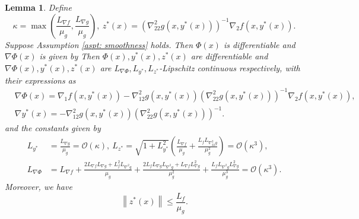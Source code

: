 \documentclass[10pt]{article}
\newtheorem{lemma}{Lemma}[section]
\theoremstyle{remark}
\newcommand{\cO}{\mathcal{O}}
\newcommand{\norm}[1]{\left\|#1\right\|}
\begin{document}
\begin{lemma}\label{lem: hypergrad}
    Define 
    \[
        \kappa = \max\left(\frac{L_{\nabla f} }{\mu_g}, \frac{L_{\nabla g}}{\mu_g}\right),\ z^*(x) = \left(\nabla_{22}^2g(x, y^*(x))\right)^{-1}\nabla_2f(x, y^*(x)).
    \]
    Suppose Assumption \ref{aspt: smoothness} holds. Then $\Phi(x)$ is differentiable and $\nabla\Phi(x)$ is given by
    Then $\Phi(x), y^*(x), z^*(x)$ are differentiable and $\nabla \Phi(x), y^*(x), z^*(x)$ are $L_{\nabla\Phi}, L_{y^*}, L_{z^*}$-Lipschitz continuous respectively, with their expressions as
    \begin{align}
        &\nabla \Phi(x) = \nabla_1 f(x, y^*(x)) - \nabla_{12}^2 g(x, y^*(x))\left(\nabla_{22}^2g(x, y^*(x))\right)^{-1}\nabla_2 f(x, y^*(x)), \label{eq: hypergrad} \\
        &\nabla y^*(x) = -\nabla_{12}^2 g(x, y^*(x))\left(\nabla_{22}^2g(x, y^*(x))\right)^{-1}. \label{eq: nabla_y}
    \end{align}
    and the constants given by
    \begin{align*}
    L_{y^*} &= \frac{L_{\nabla g}}{\mu_g} = \cO\left(\kappa\right),\  L_{z^*} = \sqrt{1 + L_{y^*}^2}\left(\frac{L_{\nabla f}}{\mu_g} + \frac{L_fL_{\nabla_{22}^2g}}{\mu_g^2}\right) = \cO\left(\kappa^3\right), \\
        L_{\nabla \Phi} &= L_{\nabla f} + \frac{2L_{\nabla f}L_{\nabla g} + L_{f}^2L_{\nabla^2 g}}{\mu_g} + \frac{2L_{f}L_{\nabla g}L_{\nabla^2 g}+L_{\nabla f}L_{\nabla g}^2}{\mu_g^2} + \frac{L_{f}L_{\nabla^2 g}L_{\nabla g}^2}{\mu_g^3} = \cO\left(\kappa^3\right).
    \end{align*}
    Moreover, we have
    \begin{equation}\label{ineq: z_star_bound}
         \norm{z^*(x)}\leq \frac{L_f}{\mu_g}.
    \end{equation}
\end{lemma}
\end{document}
